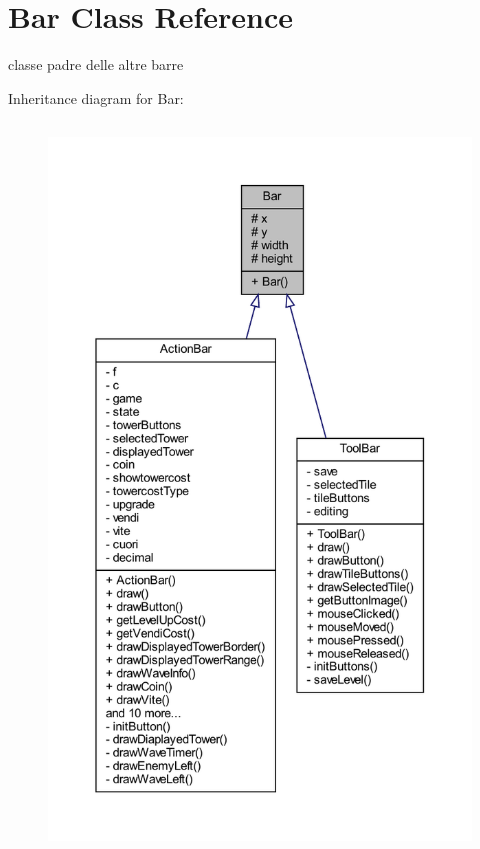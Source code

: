 \hypertarget{classui_1_1_bar}{}\section{Bar Class Reference}
\label{classui_1_1_bar}


classe padre delle altre barre  




Inheritance diagram for Bar\+:\nopagebreak
\begin{figure}[H]
\begin{center}
\leavevmode
\includegraphics[height=550pt]{classui_1_1_bar__inherit__graph}
\end{center}
\end{figure}


